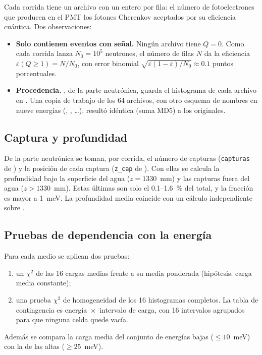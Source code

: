 \documentclass[11pt,a4paper]{article}
\newcommand{\var}[1]{\texttt{#1}}
\begin{document}
Cada corrida  tiene un archivo  con un entero por fila: el número de fotoelectrones que producen en el PMT los fotones Cherenkov aceptados por su eficiencia cuántica. Dos observaciones:
\begin{itemize}
\item \textbf{Solo contienen eventos con señal.} Ningún archivo tiene $Q=0$. Como cada corrida lanza $N_0=10^5$ neutrones, el número de filas $N$ da la eficiencia $\varepsilon(Q\geq1)=N/N_0$, con error binomial $\sqrt{\varepsilon(1-\varepsilon)/N_0}\approx0.1$ puntos porcentuales.
\item \textbf{Procedencia.} , de la parte neutrónica, guarda el histograma de cada archivo en . Una copia de trabajo de los 64 archivos, con otro esquema de nombres en nueve energías (, , \dots), resultó idéntica (suma MD5) a los originales.
\end{itemize}

\subsection{Captura y profundidad}

De la parte neutrónica se toman, por corrida, el número de capturas (\var{capturas} de ) y la posición de cada captura (\var{z\_cap} de ). Con ellas se calcula la profundidad bajo la superficie del agua ($z=1330$~mm) y las capturas fuera del agua ($z>1330$~mm). Estas últimas son solo el 0.1--1.6~\% del total, y la fracción es mayor a 1~meV. La profundidad media coincide con un cálculo independiente sobre .

\subsection{Pruebas de dependencia con la energía}

Para cada medio se aplican dos pruebas:
\begin{enumerate}
\item un $\chi^2$ de las 16 cargas medias frente a su media ponderada (hipótesis: carga media constante);
\item una prueba $\chi^2$ de homogeneidad de los 16 histogramas completos. La tabla de contingencia es energía~$\times$~intervalo de carga, con 16 intervalos agrupados para que ninguna celda quede vacía.
\end{enumerate}
Además se compara la carga media del conjunto de energías bajas ($\leq10$~meV) con la de las altas ($\geq25$~meV).
\end{document}
